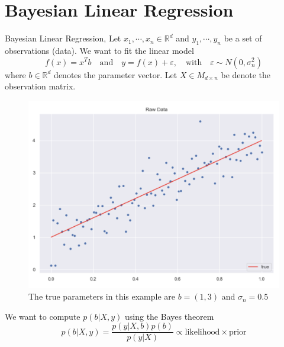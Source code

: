 \documentclass[10pt]{beamer}
\begin{document}
\section{Bayesian Linear Regression}


\begin{frame}{Bayesian Linear Regression}{\cite{reg_bayesian_regression_2019}, \cite[Chapter 2.1]{RW05}}
Let $x_1, \cdots, x_n \in \mathbb{R}^d$ and $y_1, \cdots, y_n$ be a set of observations (data). We want to fit the linear model 
$$
f(x) = x^T b \quad \text{and} \quad y = f(x) + \varepsilon, \quad \text{with} \quad \varepsilon \sim N(0, \sigma_n^2)
$$
where $b \in \mathbb{R}^d$ denotes the parameter vector. Let $X \in M_{d \times n}$ be denote the observation matrix. 
\begin{center}
\begin{figure}
\includegraphics[scale=0.14]{images/lin_raw_data.png} 
\caption{The true parameters in this example are $b=(1, 3)$ and $\sigma_n=0.5$}
\end{figure}
\end{center}
We want to compute $p(b|X, y)$ using the Bayes theorem 
$$
p(b|X, y) = \frac{p(y|X, b) p(b)}{p(y|X) } \propto \text{likelihood} \times \text{prior}
$$
\end{frame}
\end{document}
